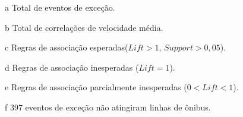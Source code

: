 \documentclass[
	12pt,				%
	oneside,			%
	a4paper,			%
	english,			%
	brazil				%
	]{abntex2ppgsi}
\begin{document}
{{\begin{apendicesenv}
\begin{table}[!htb]
\begin{threeparttable}
\begin{tablenotes}
            \item[a] Total de eventos de exceção.
            \item[b] Total de correlações de velocidade média.
            \item[c] Regras de associação esperadas($Lift > 1$, $Support > 0,05$).
            \item[d] Regras de associação inesperadas ($Lift = 1$).
            \item[e] Regras de associação parcialmente inesperadas ($0 < Lift < 1$).
            \item[f] 397 eventos de exceção não atingiram linhas de ônibus.
        \end{tablenotes}
\end{threeparttable}
\end{table}



\end{apendicesenv}}}
\end{document}
